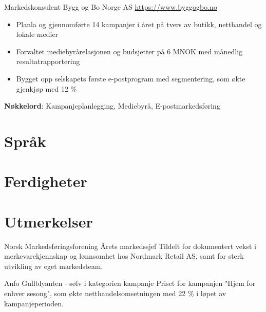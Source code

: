 \documentclass[a4paper, serif, 10pt]{moderncv}
\begin{document}
        {Markedskonsulent}
        {Bygg og Bo Norge AS}
        {\url{https://www.byggogbo.no}}
        {}
        {\begin{itemize}
\item Planla og gjennomførte 14 kampanjer i året på tvers av butikk, netthandel og lokale medier
\item Forvaltet mediebyrårelasjonen og budsjetter på 6 MNOK med månedlig resultatrapportering
\item Bygget opp selskapets første e-postprogram med segmentering, som økte gjenkjøp med 12 \%
\end{itemize}
\textbf{Nøkkelord}: Kampanjeplanlegging, Mediebyrå, E-postmarkedsføring}
\section{Språk}

\section{Ferdigheter}

\section{Utmerkelser}

        {Norsk Markedsføringsforening}
        {Årets markedssjef}
        {}
        {}
        {Tildelt for dokumentert vekst i merkevarekjennskap og lønnsomhet hos Nordmark Retail AS, samt for sterk utvikling av eget markedsteam.}

        {Anfo}
        {Gullblyanten - sølv i kategorien kampanje}
        {}
        {}
        {Priset for kampanjen "Hjem for enhver sesong", som økte netthandelsomsetningen med 22 \% i løpet av kampanjeperioden.}
\end{document}
